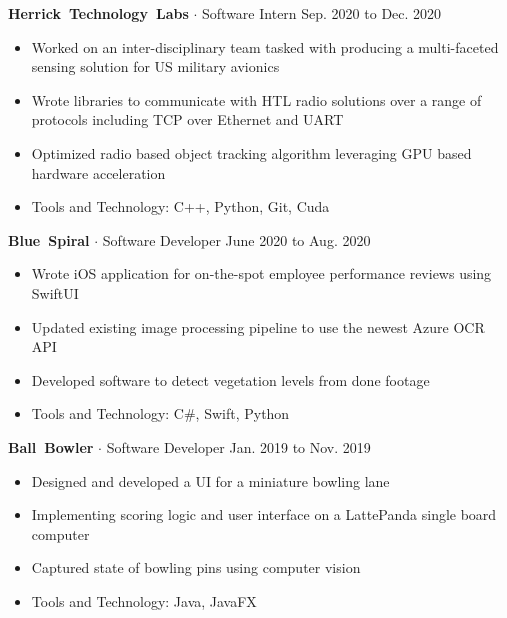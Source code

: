 \documentclass{article}
\newcommand{\rSubSubSection}[1] {
  \textbf{{\fontsize{0.35cm}{0.45cm}\selectfont \hbox{#1}}}
}
\begin{document}
\rSubSubSection{Herrick Technology Labs} $ \cdot $ Software Intern \hfill Sep. 2020 to Dec. 2020 \par
\vspace{-10pt}
\begin{itemize}
    \setlength\itemsep{0pt}
    \setlength{\parskip}{0pt}
    \item Worked on an inter-disciplinary team tasked with producing a multi-faceted sensing solution for US military avionics
    \item Wrote libraries to communicate with HTL radio solutions over a range of protocols including TCP over Ethernet and UART
    \item Optimized radio based object tracking algorithm leveraging GPU based hardware acceleration
    \item Tools and Technology: C++, Python, Git, Cuda
\end{itemize}
\vspace{-10pt}

\rSubSubSection{Blue Spiral} $ \cdot $ Software Developer \hfill June 2020 to Aug. 2020 \par
\vspace{-10pt}
\begin{itemize}
    \setlength\itemsep{0pt}
    \setlength{\parskip}{0pt}
    \item Wrote iOS application for on-the-spot employee performance reviews using SwiftUI
    \item Updated existing image processing pipeline to use the newest Azure OCR API
    \item Developed software to detect vegetation levels from done footage
    \item Tools and Technology: C\#, Swift, Python
\end{itemize}
\vspace{-10pt}

\rSubSubSection{Ball Bowler} $ \cdot $ Software Developer \hfill Jan. 2019 to Nov. 2019 \par
\vspace{-10pt}
\begin{itemize}
    \setlength\itemsep{0pt}
    \setlength{\parskip}{0pt}
    \item Designed and developed a UI for a miniature bowling lane
    \item Implementing scoring logic and user interface on a LattePanda single board computer
    \item Captured state of bowling pins using computer vision
    \item Tools and Technology: Java, JavaFX
\end{itemize}
\vspace{-10pt}
\end{document}
